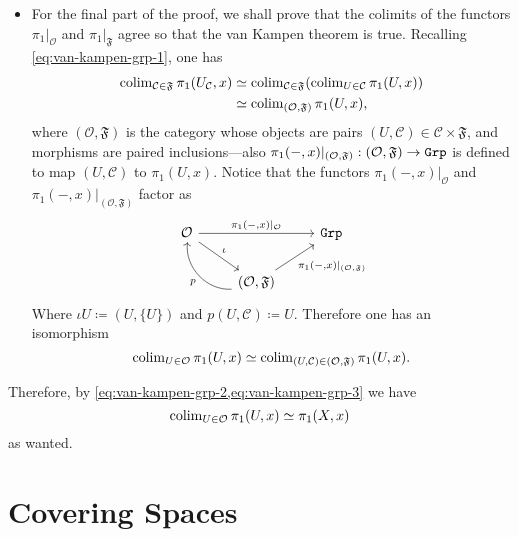 \begin{itemize}
    \item For the final part of the proof, we shall prove that the colimits of the
          functors \(\pi_1|_{\mathcal{O}}\) and \(\pi_1|_{\mathfrak{F}}\) agree so that
          the van Kampen theorem is true. Recalling \cref{eq:van-kampen-grp-1}, one has
          \begin{align*}
              \operatorname{colim}_{\mathcal{C} \in \mathfrak{F}} \pi_1(U_{\mathcal{C}}, x)
               & \simeq
              \operatorname{colim}_{\mathcal{C} \in \mathfrak{F}}(\operatorname{colim}_{U \in \mathcal{C}} \pi_1(U, x)) \\
               & \simeq
              \operatorname{colim}_{(\mathcal{O}, \mathfrak{F})} \pi_1(U, x),
          \end{align*}
          where \((\mathcal{O}, \mathfrak{F})\) is the category whose objects are pairs
          \((U, \mathcal{C}) \in \mathcal{C} \times \mathfrak{F}\), and morphisms are
          paired inclusions---also
          \(\pi_1(-, x)|_{(\mathcal{O}, \mathfrak{F})}: (\mathcal{O}, \mathfrak{F}) \to
          {\texttt{Grp}}\) is defined to map \((U, \mathcal{C})\) to \(\pi_1(U, x)\). Notice that
          the functors \(\pi_1(-, x)|_{\mathcal{O}}\) and
          \(\pi_1(-, x)|_{(\mathcal{O}, \mathfrak{F})}\) factor as
          \[
              \begin{tikzcd}
                  \mathcal{O} \ar[rr, "\pi_1{(-, x)}|_{\mathcal{O}}"] \ar[rd, "\iota"]
                  & &\Grp \\
                  &(\mathcal{O}, \mathfrak{F})
                  \ar[ru, "\pi_1{(-, x)}|_{(\mathcal{O}, \mathfrak F)}"']
                  \ar[lu, bend left=50, "p"] &
              \end{tikzcd}
          \]
          Where \(\iota U \coloneq (U, \{U\})\) and \(p (U, \mathcal{C}) \coloneq
          U\). Therefore one has an isomorphism
          \begin{equation}\label{eq:van-kampen-grp-3}
              \operatorname{colim}_{U \in \mathcal{O}} \pi_1(U, x)
              \simeq
              \operatorname{colim}_{(U, \mathcal{C}) \in (\mathcal{O}, \mathfrak F)} \pi_1(U, x).
          \end{equation}
\end{itemize}
Therefore, by \cref{eq:van-kampen-grp-2,eq:van-kampen-grp-3} we have
\[
    \operatorname{colim}_{U \in \mathcal{O}} \pi_1(U, x) \simeq \pi_1(X, x)
\]
as wanted.

\section{Covering Spaces}

